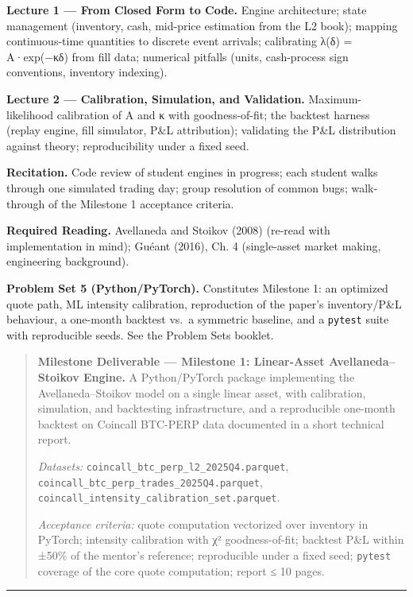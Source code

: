 \documentclass[
]{article}
\begin{document}
\textbf{Lecture 1 --- From Closed Form to Code.} Engine architecture;
state management (inventory, cash, mid-price estimation from the L2
book); mapping continuous-time quantities to discrete event arrivals;
calibrating λ(δ) = A·exp(−κδ) from fill data; numerical pitfalls (units,
cash-process sign conventions, inventory indexing).

\textbf{Lecture 2 --- Calibration, Simulation, and Validation.}
Maximum-likelihood calibration of A and κ with goodness-of-fit; the
backtest harness (replay engine, fill simulator, P\&L attribution);
validating the P\&L distribution against theory; reproducibility under a
fixed seed.

\textbf{Recitation.} Code review of student engines in progress; each
student walks through one simulated trading day; group resolution of
common bugs; walk-through of the Milestone 1 acceptance criteria.

\textbf{Required Reading.} Avellaneda and Stoikov (2008) (re-read with
implementation in mind); Guéant (2016), Ch. 4 (single-asset market
making, engineering background).

\textbf{Problem Set 5 (Python/PyTorch).} Constitutes Milestone 1: an
optimized quote path, ML intensity calibration, reproduction of the
paper's inventory/P\&L behaviour, a one-month backtest vs.~a symmetric
baseline, and a \texttt{pytest} suite with reproducible seeds. See the
Problem Sets booklet.

\begin{quote}
\textbf{Milestone Deliverable --- Milestone 1: Linear-Asset
Avellaneda--Stoikov Engine.} A Python/PyTorch package implementing the
Avellaneda--Stoikov model on a single linear asset, with calibration,
simulation, and backtesting infrastructure, and a reproducible one-month
backtest on Coincall BTC-PERP data documented in a short technical
report.

\emph{Datasets:} \texttt{coincall\_btc\_perp\_l2\_2025Q4.parquet},
\texttt{coincall\_btc\_perp\_trades\_2025Q4.parquet},
\texttt{coincall\_intensity\_calibration\_set.parquet}.

\emph{Acceptance criteria:} quote computation vectorized over inventory
in PyTorch; intensity calibration with χ² goodness-of-fit; backtest P\&L
within ±50\% of the mentor's reference; reproducible under a fixed seed;
\texttt{pytest} coverage of the core quote computation; report ≤ 10
pages.
\end{quote}

\begin{center}\rule{0.5\linewidth}{0.5pt}\end{center}
\end{document}
